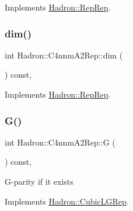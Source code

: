 Implements \mbox{\hyperlink{structHadron_1_1RepRep_a92c8802e5ed7afd7da43ccfd5b7cd92b}{Hadron\+::\+Rep\+Rep}}.

\mbox{\label{structHadron_1_1C4nnmA2Rep_a02dd57918f08f3c16982ad3f17b8fe8f}} 
\subsubsection{\texorpdfstring{dim()}{dim()}\hspace{0.1cm}{\footnotesize\ttfamily [3/3]}}
{\footnotesize\ttfamily int Hadron\+::\+C4nnm\+A2\+Rep\+::dim (\begin{DoxyParamCaption}{ }\end{DoxyParamCaption}) const\hspace{0.3cm}{\ttfamily [inline]}, {\ttfamily [virtual]}}



Implements \mbox{\hyperlink{structHadron_1_1RepRep_a92c8802e5ed7afd7da43ccfd5b7cd92b}{Hadron\+::\+Rep\+Rep}}.

\mbox{\label{structHadron_1_1C4nnmA2Rep_a7ad7f57cdcdb2bcb504ebb43d1990471}} 
\subsubsection{\texorpdfstring{G()}{G()}\hspace{0.1cm}{\footnotesize\ttfamily [1/2]}}
{\footnotesize\ttfamily int Hadron\+::\+C4nnm\+A2\+Rep\+::G (\begin{DoxyParamCaption}{ }\end{DoxyParamCaption}) const\hspace{0.3cm}{\ttfamily [inline]}, {\ttfamily [virtual]}}

G-\/parity if it exists 

Implements \mbox{\hyperlink{structHadron_1_1CubicLGRep_ace26f7b2d55e3a668a14cb9026da5231}{Hadron\+::\+Cubic\+L\+G\+Rep}}.

\mbox{\label{structHadron_1_1C4nnmA2Rep_a7ad7f57cdcdb2bcb504ebb43d1990471}} 
